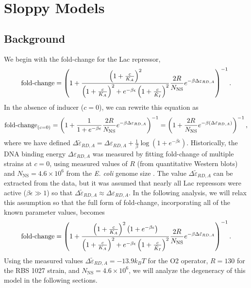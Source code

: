 \pagebreak
\section{Sloppy Models} \label{AppendixSloppiness}

\subsection{Background}

We begin with the fold-change for the Lac repressor,
\begin{equation}
\operatorname{fold-change}= \left(
1+\frac{\left(1+\frac{c}{K_A}\right)^2}{\left(1+\frac{c}{K_A}\right)^2+e^{-\beta \epsilon}\left(1 + \frac{c}{\tilde{K}_I}\right)^2}\frac{2 R}{N_{\text{NS}}}e^{-\beta \Delta\varepsilon_{RD,A}} \right)^{-1}.
\end{equation}
In the absence of inducer ($c = 0$), we can rewrite this equation as
\begin{equation}
\operatorname{fold-change}_{(c=0)}= \left(
1+\frac{1}{1+e^{-\beta \epsilon}}\frac{2 R}{N_{\text{NS}}}e^{-\beta \Delta\varepsilon_{RD,A}} \right)^{-1} = \left(
1+\frac{2 R}{N_{\text{NS}}}e^{-\beta \left( \Delta\tilde{\varepsilon}_{RD,A} \right) } \right)^{-1},
\end{equation}
where we have defined $\Delta\tilde{\varepsilon}_{RD,A} = \Delta\varepsilon_{RD,A} + \frac{1}{\beta} \log \left( 1 + e^{-\beta \epsilon} \right) $. Historically, the DNA binding energy $\Delta\varepsilon_{RD,A}$ was measured by fitting fold-change of multiple strains at $c = 0$, using measured values of $R$ (from quantitative Western blots) and $N_{\text{NS}} = 4.6
\times 10^6$ from the \textit{E. coli} genome size \cite{Garcia2011}. The value $\Delta\tilde{\varepsilon}_{RD,A}$ can be extracted from the data, but it was assumed that nearly all Lac repressors were active ($\beta \epsilon \gg 1$) so that $\Delta\tilde{\varepsilon}_{RD,A} \approx \Delta\varepsilon_{RD,A}$. In the following analysis, we will relax this assumption so that the full form of fold-change, incorporating all of the known parameter values, becomes
\begin{equation} \label{SIFullFoldChangeExpression}
\operatorname{fold-change}= \left(
1+\frac{\left(1+\frac{c}{K_A}\right)^2 \left( 1 + e^{-\beta \epsilon} \right)}{\left(1+\frac{c}{K_A}\right)^2+e^{-\beta \epsilon}\left(1 + \frac{c}{\tilde{K}_I}\right)^2}\frac{2 R}{N_{\text{NS}}}e^{-\beta \Delta\tilde{\varepsilon}_{RD,A}} \right)^{-1}.
\end{equation}
Using the measured values $\Delta\tilde{\varepsilon}_{RD,A} = -13.9 k_B T$ for
the O2 operator, $R=130$ for the RBS 1027 strain, and $N_{\text{NS}} = 4.6
\times 10^6$, we will analyze the degeneracy of this model in the following
sections.

